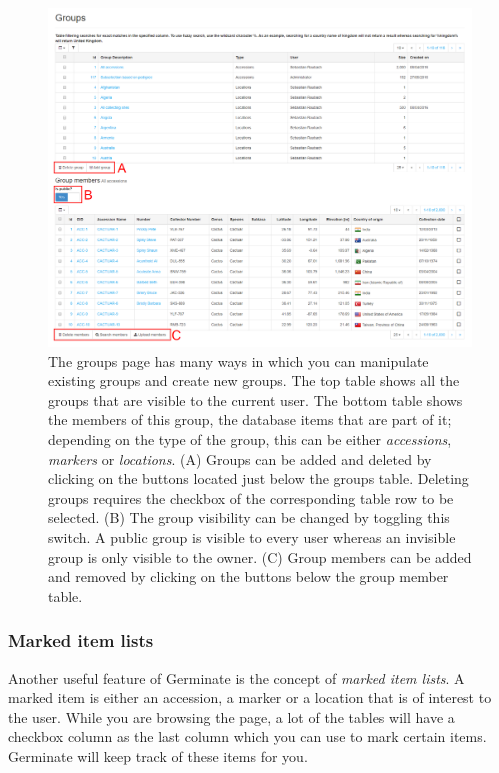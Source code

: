 \begin{figure}
	\centering
	\includegraphics[width=0.85\linewidth]{img/features/groups-page.png}
	\caption{The groups page has many ways in which you can manipulate existing groups and create new groups. The top table shows all the groups that are visible to the current user. The bottom table shows the members of this group, \ie the database items that are part of it; depending on the type of the group, this can be either \textit{accessions}, \textit{markers} or \textit{locations}. (A) Groups can be added and deleted by clicking on the buttons located just below the groups table. Deleting groups requires the checkbox of the corresponding table row to be selected. (B) The group visibility can be changed by toggling this switch. A public group is visible to every user whereas an invisible group is only visible to the owner. (C) Group members can be added and removed by clicking on the buttons below the group member table.}
	\label{fig:features:groups-page}
\end{figure}

\subsubsection{Marked item lists}
\label{sec:features:marked-items}

Another useful feature of Germinate is the concept of \textit{marked item lists}. A marked item is either an accession, a marker or a location that is of interest to the user. While you are browsing the page, a lot of the tables will have a checkbox column as the last column which you can use to mark certain items. Germinate will keep track of these items for you.

